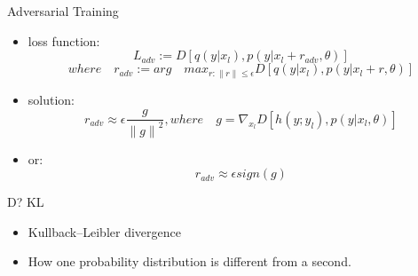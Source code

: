 \begin{frame}[fragile]{Adversarial Training}
	\begin{itemize}
		\item loss function:
		\[
			L_{adv}:=D[q(y|x_l),p(y|x_l+r_{adv},\theta)] 
		\]
		\[	where\quad  r_{adv}:=arg\quad max_{r:\|r\|\leqslant \epsilon} \mathit{D}[q(y|x_l),p(y|x_l+r, \theta)]
		\]
		\item solution:
		\[
		 	r_{adv}\approx \epsilon\frac{g}{{\|g\|}^2},where \quad g=\nabla_{x_l}\mathit{D}[h(y;y_l),p(y|x_l, \theta)]
		\]
		\item or:
		\[
			r_{adv}\approx \epsilon \mathit{sign(g)}
		\]
	\end{itemize}
\end{frame}

\begin{frame}[fragile]{D? KL}
	\begin{itemize}
	\item Kullback–Leibler divergence
	\item How one probability distribution is different from a second.
	\end{itemize}

\end{frame}

